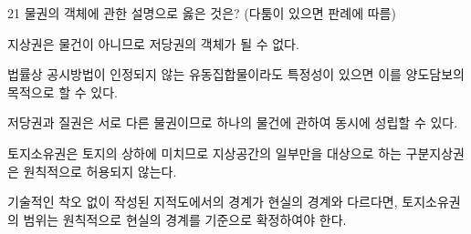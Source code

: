 \begin{question}{21}
물권의 객체에 관한 설명으로 옳은 것은? (다툼이 있으면 판례에 따름)
\begin{choices}
  \item 지상권은 물건이 아니므로 저당권의 객체가 될 수 없다.
  \item 법률상 공시방법이 인정되지 않는 유동집합물이라도 특정성이 있으면 이를 양도담보의 목적으로 할 수 있다.
  \item 저당권과 질권은 서로 다른 물권이므로 하나의 물건에 관하여 동시에 성립할 수 있다.
  \item 토지소유권은 토지의 상하에 미치므로 지상공간의 일부만을 대상으로 하는 구분지상권은 원칙적으로 허용되지 않는다.
  \item 기술적인 착오 없이 작성된 지적도에서의 경계가 현실의 경계와 다르다면, 토지소유권의 범위는 원칙적으로 현실의 경계를 기준으로 확정하여야 한다.
\end{choices}
\end{question}
